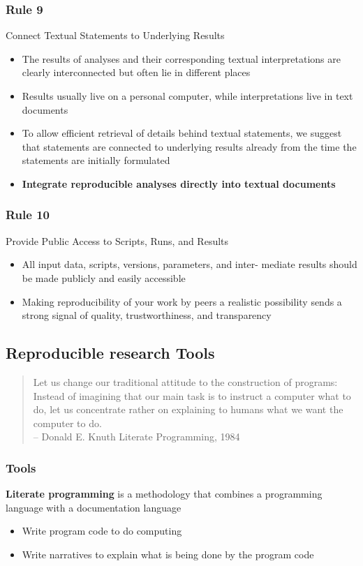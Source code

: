 \documentclass{beamer}
\begin{document}
\begin{frame}
\frametitle{Rule 9}
{\sc Connect Textual Statements to Underlying Results}
\begin{itemize}
    \item The results of analyses and their corresponding textual interpretations are clearly interconnected but often lie in different places
    \item Results usually live on a personal computer, while interpretations live in text documents
    \item To allow efficient retrieval of details behind textual statements, we suggest that statements are connected to underlying results already from the time the statements are initially formulated
    \item {\bf Integrate reproducible analyses directly into textual documents}
\end{itemize}
\end{frame}
\begin{frame}
\frametitle{Rule 10}
{\sc Provide Public Access to Scripts, Runs, and Results}
\begin{itemize}
    \item All input data, scripts, versions, parameters, and inter- mediate results should be made publicly and easily accessible
    \item Making reproducibility of your work by peers a realistic possibility sends a strong signal of quality, trustworthiness, and transparency
\end{itemize}
\end{frame}
\begin{frame}
\section{Reproducible research Tools}
\begin{quote}
\scriptsize    Let us change our traditional attitude to the construction of programs: Instead of imagining that our main task is to instruct a computer what to do, let us concentrate rather on explaining to humans what we want the computer to do.\\
\raggedleft   -- Donald E. Knuth Literate Programming, 1984
\end{quote}
\end{frame}

\begin{frame}
\frametitle{Tools}
{\bf Literate programming} is a methodology that combines a programming language with a documentation language\\ 
\begin{itemize}
    \item Write program code to do computing
    \item Write narratives to explain what is being done by the program code
\end{itemize}
\end{frame}
\end{document}
